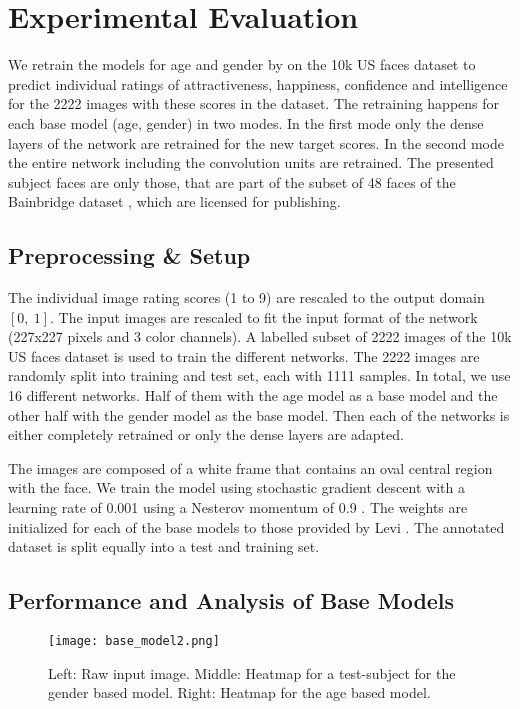 \documentclass[runningheads]{llncs}
\begin{document}
\section{Experimental Evaluation}
We retrain the models for age and gender by \cite{levi2015age} on the 10k US faces dataset \cite{bainbridge2013intrinsic} to predict individual ratings of attractiveness, happiness, confidence and intelligence for the 2222 images with these scores in the dataset. The retraining happens for each base model (age, gender) in two modes. In the first mode only the dense layers of the network are retrained for the new target scores. In the second mode the entire network including the convolution units are retrained. The presented subject faces are only those, that are part of the subset of 48 faces of the Bainbridge dataset \cite{bainbridge2013intrinsic}, which are licensed for publishing.

\subsection{Preprocessing \& Setup}
The individual image rating scores (1 to 9) are rescaled to the output domain $\left[0,\ 1\right]$. The input images are rescaled to fit the input format of the network (227x227 pixels and 3 color channels). A labelled subset of 2222 images of the 10k US faces dataset is used to train the different networks. The 2222 images are randomly split into training and test set, each with 1111 samples. In total, we use 16 different networks. Half of them with the age model as a base model and the other half with the gender model as the base model. Then each of the networks is either completely retrained or only the dense layers are adapted.

The images are composed of a white frame that contains an oval central region with the face. 
We train the model using stochastic gradient descent with a learning rate of 0.001 using a Nesterov momentum of 0.9 \cite{lecun2012efficient}. The weights are initialized for each of the base models to those	 provided by Levi \cite{levi2015age}. 
The annotated dataset is split equally into a test and training set.


\subsection{Performance and Analysis of Base Models}

\begin{figure}[!htb]
\centering
\texttt{[image: base\_model2.png]}
\caption{
Left: Raw input image. Middle: Heatmap for a test-subject for the gender based model. Right: Heatmap for the age based model. 
}
\label{fig:base_model}
\end{figure}
\end{document}
